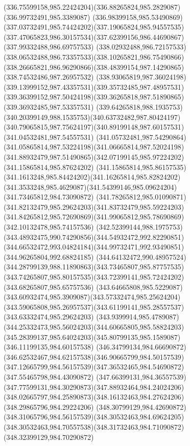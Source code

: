 {{		\curveto(336.75599158,985.22424204)(336.88265824,985.2829087)(336.99732491,985.3389087)
		\curveto(336.98399158,985.53490869)(337.03732491,985.74424202)(337.19065824,985.94557535)
		\curveto(337.47065823,986.30157534)(337.62399156,986.44690867)(337.99332488,986.69757533)
		\curveto(338.02932488,986.72157533)(338.06532488,986.73357533)(338.10265821,986.75490866)
		\curveto(338.26665821,986.96290866)(338.48399154,987.14290865)(338.74532486,987.26957532)
		\curveto(338.93065819,987.36024198)(339.13999152,987.43357531)(339.35732485,987.48957531)
		\curveto(339.36399152,987.50424198)(339.36265818,987.51890865)(339.36932485,987.53357531)
		\curveto(339.64265818,988.1935753)(340.20399149,988.1535753)(340.63732482,987.80424197)
		\curveto(340.79065815,987.75624197)(340.89199148,987.60157531)(341.04532481,987.54557531)
		\curveto(341.05732481,987.54290864)(341.05865814,987.53224198)(341.06665814,987.52024198)
		\curveto(341.88932479,987.51490865)(342.07199145,985.97224202)(341.15865814,985.87624202)
		\curveto(341.15865814,985.86157535)(341.1613248,985.84424202)(341.16265814,985.82824202)
		\curveto(341.3533248,985.4629087)(341.54399146,985.09624204)(341.73465812,984.73090872)
		\curveto(341.78265812,985.01090871)(341.82132479,985.29624203)(341.83732479,985.59224203)
		\curveto(341.84265812,985.72690869)(341.99065812,985.78690869)(342.10132478,985.74157536)
		\curveto(342.52399144,988.1975753)(343.48932475,990.74290856)(344.54932472,992.82290851)
		\curveto(344.66532472,993.04824184)(344.99732471,992.93490851)(344.96265804,992.68824185)
		\curveto(344.64132472,990.48957524)(344.28799139,988.11890863)(343.73465807,985.87757535)
		\curveto(343.74265807,985.80157535)(343.72399141,985.72424202)(343.68265807,985.65757536)
		\curveto(343.64665808,985.5229087)(343.60932474,985.3909087)(343.57332474,985.25624204)
		\curveto(343.59065808,985.26957537)(343.61199141,985.28557537)(343.63332474,985.29624203)
		\curveto(343.9399914,985.4789087)(344.25332473,985.56024203)(344.60665805,985.58824203)
		\curveto(345.28399137,985.64024203)(345.80799135,985.1589087)(346.11199135,984.60157538)
		\curveto(346.34799134,984.66690872)(346.62532467,984.62157538)(346.90665799,984.50157539)
		\curveto(347.12665799,984.56157539)(347.36532465,984.54690872)(347.55465798,984.43090872)
		\curveto(347.66399131,984.36557539)(347.77599131,984.30290873)(347.88932464,984.24024206)
		\curveto(348.02665797,984.25890873)(348.16132463,984.27624206)(348.29865796,984.29224206)
		\curveto(348.30799129,984.42690872)(348.31065796,984.56157539)(348.30532463,984.69624205)
		\curveto(348.30532463,984.70557538)(348.31732463,984.71090872)(348.32399129,984.70290872)
}}
